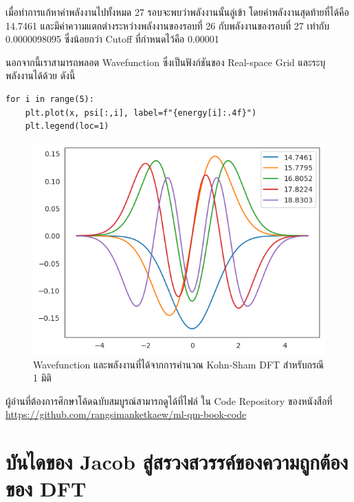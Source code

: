 \vspace{1em}

เมื่อทำการแก้หาค่าพลังงานไปทั้งหมด 27 รอบจะพบว่าพลังงานนั้นลู่เข้า โดยค่าพลังงานสุดท้ายที่ได้คือ 14.7461 และมีค่าความแตกต่างระหว่างพลังงานของรอบที่ 26 กับพลังงานของรอบที่ 27 เท่ากับ 0.0000098095 ซึ่งน้อยกว่า Cutoff ที่กำหนดไว้คือ 0.00001

นอกจากนี้เราสามารถพลอต Wavefunction ซึ่งเป็นฟังก์ชันของ Real-space Grid และระบุพลังงานได้ด้วย ดังนี้

\begin{lstlisting}[style=MyPython]
for i in range(5):
    plt.plot(x, psi[:,i], label=f"{energy[i]:.4f}")
    plt.legend(loc=1)
\end{lstlisting}

\vspace{1em}

\begin{figure}[H]
    \centering
    \includegraphics[width=0.75\linewidth]{fig/ks_dft_1d_wfn_ener.png}
    \caption{Wavefunction และพลังงานที่ได้จากการคำนวณ Kohn-Sham DFT สำหรับกรณี 1 มิติ}
    \label{fig:ks_dft_1d_wfn_ener}
\end{figure}

ผู้อ่านที่ต้องการศึกษาโค้ดฉบับสมบูรณ์สามารถดูได้ที่ไฟล์  ใน Code Repository ของหนังสือที่ \url{https://github.com/rangsimanketkaew/ml-qm-book-code}

\section{บันไดของ Jacob สู่สรวงสวรรค์ของความถูกต้องของ DFT}
\label{sec:jacob_ladder}


